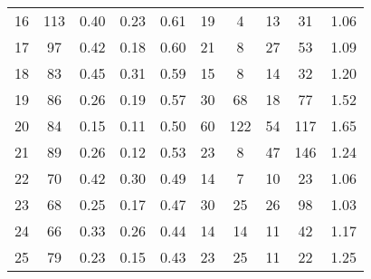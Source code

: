 \documentclass[usenatbib]{mn2e}
\begin{document}
{\begin{table*}
\begin{center}
\begin{tabular}{lccccccccc}
16 &      113 &                             0.40 &                             0.23 &                             0.61 &              19 &               4 &                                 13 &                              31 &       1.06 \\
17 &       97 &                             0.42 &                             0.18 &                             0.60 &              21 &               8 &                                 27 &                              53 &       1.09 \\
18 &       83 &                             0.45 &                             0.31 &                             0.59 &              15 &               8 &                                 14 &                              32 &       1.20 \\
19 &       86 &                             0.26 &                             0.19 &                             0.57 &              30 &              68 &                                 18 &                              77 &       1.52 \\
20 &       84 &                             0.15 &                             0.11 &                             0.50 &              60 &             122 &                                 54 &                             117 &       1.65 \\
21 &       89 &                             0.26 &                             0.12 &                             0.53 &              23 &               8 &                                 47 &                             146 &       1.24 \\
22 &       70 &                             0.42 &                             0.30 &                             0.49 &              14 &               7 &                                 10 &                              23 &       1.06 \\
23 &       68 &                             0.25 &                             0.17 &                             0.47 &              30 &              25 &                                 26 &                              98 &       1.03 \\
24 &       66 &                             0.33 &                             0.26 &                             0.44 &              14 &              14 &                                 11 &                              42 &       1.17 \\
25 &       79 &                             0.23 &                             0.15 &                             0.43 &              23 &              25 &                                 11 &                              22 &       1.25 \\

\end{tabular}
\end{center}
\end{table*}}
\end{document}
